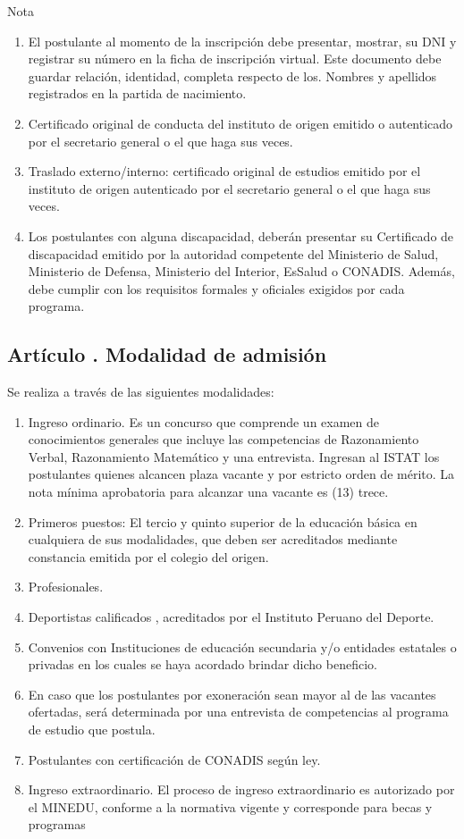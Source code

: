 Nota
\begin{enumerate}
\item El postulante al momento de la inscripción debe presentar, mostrar, su DNI y registrar su número en la ficha de inscripción virtual. Este documento debe guardar relación, identidad, completa respecto de los. Nombres y apellidos registrados en la partida de nacimiento.
\item Certificado original de conducta del instituto de origen emitido o autenticado por el secretario general o el que haga sus veces.
\item Traslado externo/interno: certificado original de estudios emitido por el instituto de origen autenticado por el secretario general o el que haga sus veces.
\item Los postulantes con alguna discapacidad, deberán presentar su Certificado de discapacidad emitido por la autoridad competente del Ministerio de Salud, Ministerio de Defensa, Ministerio del Interior, EsSalud o CONADIS. Además, debe cumplir con los requisitos formales y oficiales exigidos por cada programa.
\end{enumerate}
\subsection{Artículo . Modalidad de admisión}
\addtocounter{ns}{1}
Se realiza a través de las siguientes modalidades: 
\begin{enumerate}
\item Ingreso ordinario. Es un concurso que comprende un examen de conocimientos generales que incluye las competencias de Razonamiento Verbal, Razonamiento Matemático y una entrevista. Ingresan al ISTAT los postulantes quienes alcancen plaza vacante y por estricto orden de mérito. La nota mínima aprobatoria para alcanzar una vacante es (13) trece.
\item Primeros puestos: El tercio y quinto superior de la educación básica en cualquiera de sus modalidades, que deben ser acreditados mediante constancia emitida por el colegio del origen. 
\item Profesionales. 
\item Deportistas calificados , acreditados por el Instituto Peruano del Deporte. 
\item Convenios con Instituciones de educación secundaria y/o entidades estatales o privadas en los cuales se haya acordado brindar dicho beneficio. 
\item En caso que los postulantes por exoneración sean mayor al de las vacantes ofertadas, será determinada por una entrevista de competencias al programa de estudio que postula.
\item Postulantes con certificación de CONADIS según ley. 
\item Ingreso extraordinario. El proceso de ingreso extraordinario es autorizado por el MINEDU, conforme a la normativa vigente y corresponde para becas y programas
\end{enumerate}
